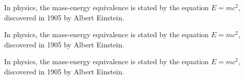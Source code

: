 \documentclass[12pt, letterpaper]{article}
\begin{document}
In physics, the mass-energy equivalence is stated by the equation $E = mc^2$, discovered in 1905 by Albert Einstein.

In physics, the mass-energy equivalence is stated by the equation \(E = mc^2\), discovered in 1905 by Albert Einstein.

In physics, the mass-energy equivalence is stated by the equation \begin{math}E = mc^2\end{math}, discovered in 1905 by Albert Einstein.
\end{document}
